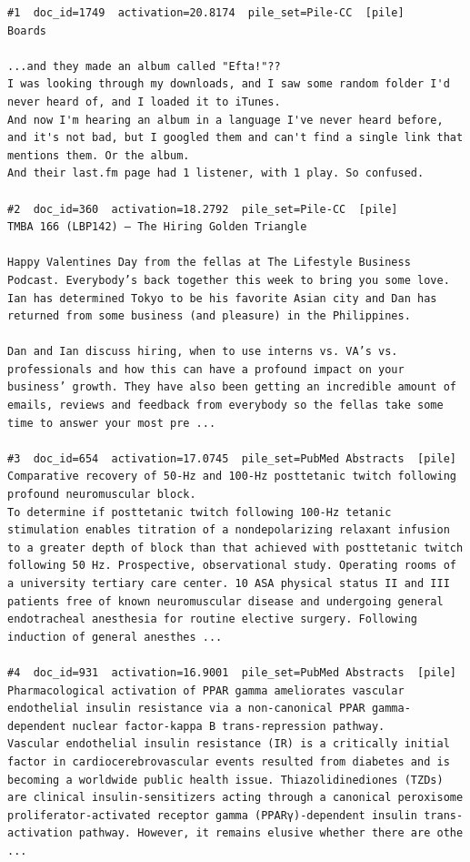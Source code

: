 \begin{verbatim}
#1  doc_id=1749  activation=20.8174  pile_set=Pile-CC  [pile]
Boards

...and they made an album called "Efta!"??
I was looking through my downloads, and I saw some random folder I'd never heard of, and I loaded it to iTunes.
And now I'm hearing an album in a language I've never heard before, and it's not bad, but I googled them and can't find a single link that mentions them. Or the album.
And their last.fm page had 1 listener, with 1 play. So confused.

#2  doc_id=360  activation=18.2792  pile_set=Pile-CC  [pile]
TMBA 166 (LBP142) – The Hiring Golden Triangle

Happy Valentines Day from the fellas at The Lifestyle Business Podcast. Everybody’s back together this week to bring you some love. Ian has determined Tokyo to be his favorite Asian city and Dan has returned from some business (and pleasure) in the Philippines.

Dan and Ian discuss hiring, when to use interns vs. VA’s vs. professionals and how this can have a profound impact on your business’ growth. They have also been getting an incredible amount of emails, reviews and feedback from everybody so the fellas take some time to answer your most pre ...

#3  doc_id=654  activation=17.0745  pile_set=PubMed Abstracts  [pile]
Comparative recovery of 50-Hz and 100-Hz posttetanic twitch following profound neuromuscular block.
To determine if posttetanic twitch following 100-Hz tetanic stimulation enables titration of a nondepolarizing relaxant infusion to a greater depth of block than that achieved with posttetanic twitch following 50 Hz. Prospective, observational study. Operating rooms of a university tertiary care center. 10 ASA physical status II and III patients free of known neuromuscular disease and undergoing general endotracheal anesthesia for routine elective surgery. Following induction of general anesthes ...

#4  doc_id=931  activation=16.9001  pile_set=PubMed Abstracts  [pile]
Pharmacological activation of PPAR gamma ameliorates vascular endothelial insulin resistance via a non-canonical PPAR gamma-dependent nuclear factor-kappa B trans-repression pathway.
Vascular endothelial insulin resistance (IR) is a critically initial factor in cardiocerebrovascular events resulted from diabetes and is becoming a worldwide public health issue. Thiazolidinediones (TZDs) are clinical insulin-sensitizers acting through a canonical peroxisome proliferator-activated receptor gamma (PPARγ)-dependent insulin trans-activation pathway. However, it remains elusive whether there are othe ...


\end{verbatim}
